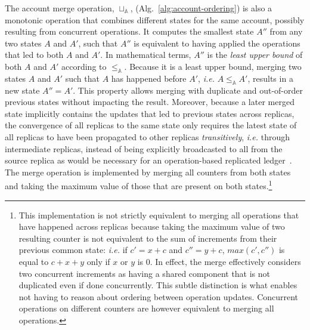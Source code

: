 \documentclass[9pt, oneside]{article}   	%
\begin{document}
The account merge operation, $\sqcup_\mathds{A}$, (Alg.~\ref{alg:account-ordering}) is also a monotonic operation that combines different states for the same account, possibly resulting from concurrent operations. It computes the smallest state $A''$ from any two states $A$ and $A'$, such that $A''$ is equivalent to having applied the operations that led to both $A$ and $A'$. In mathematical terms, $A''$ is the \textit{least upper bound} of both $A$ and $A'$ according to $\leq_\mathds{A}$. Because it is a least upper bound, merging two states $A$ and $A'$ such that $A$ has happened before $A'$, \textit{i.e.} $A \leq_\mathds{A} A'$, results in a new state $A'' = A'$. This property allows merging with duplicate and out-of-order previous states without impacting the result. Moreover, because a later merged state implicitly contains the updates that led to previous states across replicas, the convergence of all replicas to the same state only requires the latest state of all replicas to have been propagated to other replicas \textit{transitively}, \textit{i.e.} through intermediate replicas, instead of being explicitly broadcasted to all from the source replica as would be necessary for an operation-based replicated ledger~\cite{shapiro:hal-00932836}. The merge operation is implemented by merging all counters from both states and taking the maximum value of those that are present on both states.\footnote{This implementation is not strictly equivalent to merging all operations that have happened across replicas because taking the maximum value of two resulting counter is not equivalent to the sum of increments from their previous common state: \textit{i.e.} if $c' = x + c$ and $c'' = y + c$, $max(c', c'')$ is equal to $c + x + y$ only if $x$ or $y$ is $0$. In effect, the merge effectively considers two concurrent increments as having a shared component that is not duplicated even if done concurrently. This subtle distinction is what enables not having to reason about ordering between operation updates. Concurrent operations on different counters are however equivalent to merging all operations.}
\end{document}
